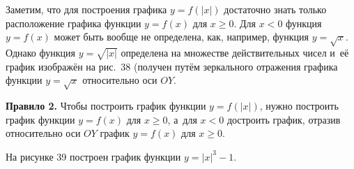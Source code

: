 Заметим, что для построения графика $y = f(|x|)$ достаточно знать только
расположение графика функции $y = f(x)$ для $x \geqslant 0$.
Для $x < 0$ функция $y = f(x)$ может быть вообще не определена, как,
например, функция $y = \sqrt{x}$. Однако функция $y = \sqrt{|x|}$
определена на множестве действительных чисел и~её график изображён
на рис.\ 38 (получен путём зеркального отражения графика функции $y = \sqrt{x}$
относительно оси $OY$.

\begin{figure}
\end{figure}

\textbf{Правило 2.} Чтобы построить график функции $y = f(|x|)$, нужно построить
график функции $y = f(x)$ для $x \geqslant 0$, а~для $x < 0$ достроить график,
отразив относительно оси $OY$ график $y = f(x)$ для $x \geqslant 0$.

\begin{figure}
\end{figure}

На рисунке 39 построен график функции $y = |x|^{3} - 1$.

\begin{figure}
\end{figure}


